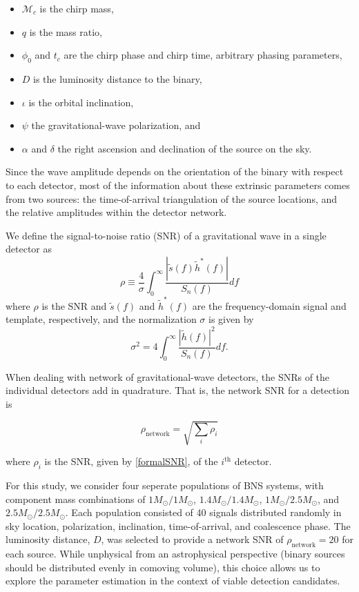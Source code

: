 \documentclass[11pt,a4paper]{emulateapj}
\newcommand{\chmass}{\mathcal{M}_c}
\begin{document}
\begin{itemize}
\item $\chmass$ is the chirp mass,
\item $q$ is the mass ratio,
\item $\phi_0$ and $t_c$ are the chirp phase and chirp time, arbitrary phasing parameters,
\item $D$ is the luminosity distance to the binary,
\item $\iota$ is the orbital inclination, 
\item $\psi$ the gravitational-wave polarization, and
\item $\alpha$ and $\delta$ the right ascension and declination of the
source on the sky.
\end{itemize}
  Since the wave amplitude depends on the orientation of the
binary with respect to each detector, most of the information about these extrinsic
parameters comes from two sources: the time-of-arrival triangulation of 
the source locations, and the relative amplitudes within the detector network.

We define the signal-to-noise ratio (SNR) of a gravitational wave in a
single detector as 
\begin{equation}
  \rho \equiv \frac{4}{\sigma} \int^{\infty}_{0}\frac{| \tilde{s}(f)\tilde{h}^{*}(f)|}{S_{n}(f)}df
  \label{formalSNR}
\end{equation}
where $\rho$ is the SNR and $\tilde s(f)$ and $\tilde{h}^{*}(f)$ are
the frequency-domain signal and template, respectively, and the normalization $\sigma$ is
given by
\begin{equation}
  \sigma^2 = 4\int^{\infty}_{0}\frac{| \tilde{h}(f)|^2}{S_n(f)}df.
  \label{SNRnorm}
\end{equation}

When dealing with network of gravitational-wave detectors, the SNRs of the individual detectors add in quadrature.  That is, the network SNR for a detection is

\begin{equation}
\rho_{\text{network}} = \sqrt{\sum_i \rho_{i}}
\label{SNRnetwork}
\end{equation}

\noindent where $\rho_i$ is the SNR, given by \eqref{formalSNR}, of the $i^{\text{th}}$ detector.

For this study, we consider four seperate populations of BNS systems, with component mass 
combinations of $1M_{\odot}/1M_{\odot}$, $1.4M_{\odot}/1.4M_{\odot}$, $1M_{\odot}/2.5M_{\odot}$, 
and $2.5M_{\odot}/2.5M_{\odot}$.  Each population consisted of 40 signals distributed randomly
in sky location, polarization, inclination, time-of-arrival, and coalescence phase.  The luminosity 
distance, $D$, was selected to provide a network SNR of $\rho_{\text{network}}=20$ for each source.
While unphysical from an astrophysical perspective (binary sources should be 
distributed evenly in comoving volume), this choice allows us to explore the parameter estimation
in the context of viable detection candidates. 
\end{document}
